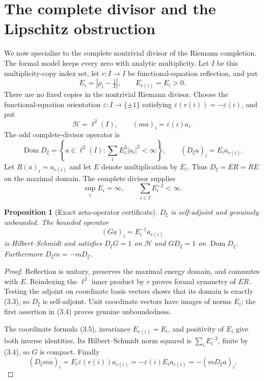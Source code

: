 \documentclass[11pt,reqno]{amsart}
\newtheorem{proposition}[theorem]{Proposition}
\newcommand{\Dom}{\operatorname{Dom}}
\newcommand{\eps}{\varepsilon}
\newcommand{\cH}{\mathcal H}
\begin{document}
\section{The complete divisor and the Lipschitz obstruction}\label{sec:p1}

We now specialize to the complete nontrivial divisor of the Riemann completion.  The formal model
keeps every zero with analytic multiplicity.  Let $I$ be this multiplicity-copy index set, let
$r:I\to I$ be functional-equation reflection, and put
\[
 E_i=\left|\rho_i-\tfrac12\right|,\qquad E_{r(i)}=E_i>0. \tag{3.1}
\]
There are no fixed copies in the nontrivial Riemann divisor.  Choose the functional-equation orientation
$\eps:I\to\{\pm1\}$ satisfying $\eps(r(i))=-\eps(i)$, and put
\[
 \cH=\ell^2(I),\qquad (ma)_i=\eps(i)a_i.             \tag{3.2}
\]
The odd complete-divisor operator is
\[
 \Dom D_\xi=\left\{a\in\ell^2(I):\sum_i E_i^2|a_i|^2<\infty\right\},
 \qquad (D_\xi a)_i=E_i a_{r(i)}.                    \tag{3.3}
\]
Let $R(a)_i=a_{r(i)}$ and let $E$ denote multiplication by $E_i$.  Thus $D_\xi=ER=RE$ on the
maximal domain.  The complete divisor supplies
\[
       \sup_i E_i=\infty,\qquad \sum_{i\in I}E_i^{-2}<\infty.       \tag{3.4}
\]

\begin{proposition}[Exact zeta-operator certificate]\label{prop:zetacertificate}
$D_\xi$ is self-adjoint and genuinely unbounded.  The bounded operator
\[
                   (Ga)_i=E_i^{-1}a_{r(i)}                         \tag{3.5}
\]
is Hilbert--Schmidt and satisfies $D_\xi G=1$ on $\cH$ and $GD_\xi=1$ on $\Dom D_\xi$.
Furthermore $D_\xi m=-mD_\xi$.
\end{proposition}

\begin{proof}
Reflection is unitary, preserves the maximal energy domain, and commutes with $E$.  Reindexing the
$\ell^2$ inner product by $r$ proves formal symmetry of $ER$.  Testing the adjoint on coordinate
basis vectors shows that its domain is exactly (3.3), so $D_\xi$ is self-adjoint.  Unit coordinate
vectors have images of norms $E_i$; the first assertion in (3.4) proves genuine unboundedness.

The coordinate formula (3.5), invariance $E_{r(i)}=E_i$, and positivity of $E_i$ give both inverse
identities.  Its Hilbert--Schmidt norm squared is $\sum_iE_i^{-2}$, finite by (3.4), so $G$ is
compact.  Finally
\[
 (D_\xi ma)_i=E_i\eps(r(i))a_{r(i)}
             =-\eps(i)E_i a_{r(i)}=-(mD_\xi a)_i.
\]
\end{proof}
\end{document}
